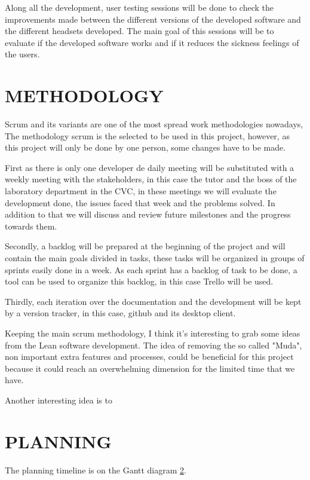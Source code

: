 \documentclass[10pt,a4paper,twocolumn,twoside]{article}
\begin{document}
Along all the development, user testing sessions will be done to check the improvements made between the different versions of the developed software and the different headsets developed. The main goal of this sessions will be to evaluate if the developed software works and if it reduces the sickness feelings of the users.

\section{METHODOLOGY}
Scrum and its variants are one of the most spread work methodologies nowadays, 
The methodology scrum is the selected to be used in this project, however, as this project will only be done by one person, some changes have to be made. 

First as there is only one developer de daily meeting will be substituted with a weekly meeting with the stakeholders, in this case the tutor and the boss of the laboratory department in the CVC, in these meetings we will evaluate the development done, the issues faced that week and the problems solved. In addition to that we will discuss and review future milestones and the progress towards them.

Secondly, a backlog will be prepared at the beginning of the project and will contain the main goals divided in tasks, these tasks will be organized in groups of sprints easily done in a week. As each sprint has a backlog of task to be done, a tool can be used to organize this backlog, in this case Trello\cite{trello} will be used.

Thirdly, each iteration over the documentation and the development will be kept by a version tracker, in this case, github\cite{github} and its desktop client\cite{githubDesktop}. 

Keeping the main scrum methodology, I think it's interesting to grab some ideas from the Lean software development\cite{leanMethod}. The idea of removing the so called "Muda", non important extra features and processes, could be beneficial for this project because it could reach an overwhelming dimension for the limited time that we have.

Another interesting idea is to




\section{PLANNING}
The planning timeline is on the Gantt diagram \ref{}.
\end{document}
